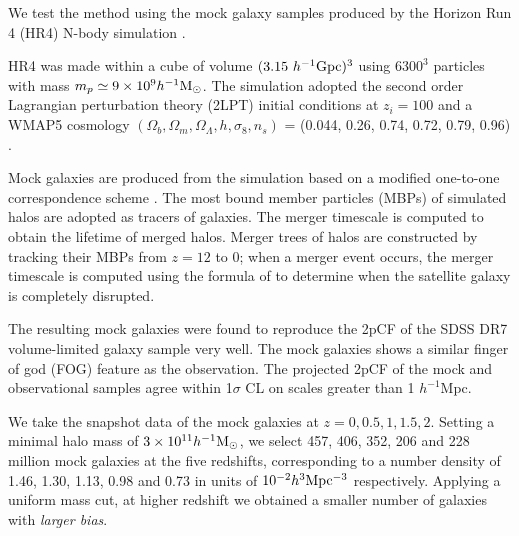\documentclass[iop]{emulateapj}
\newcommand{\hMsun}{{\ifmmode{h^{-1}{\rm
        {M_{\odot}}}}\else{$h^{-1}{\rm{M_{\odot}}}$~}\fi}}
\begin{document}
We test the method using the mock galaxy samples produced by the Horizon Run 4  (HR4) N-body simulation \citep{hr4,hong2016}.

HR4 was made within a cube of volume $({3.15}\ h^{-1}\rm Gpc)^3$ using  $6300^3$ particles with mass $m_p\simeq 9 \times 10^9 \hMsun$.
The simulation adopted the second order Lagrangian perturbation theory (2LPT) initial conditions at $z_{i}=100$
and a WMAP5 cosmology $(\Omega_{b},\Omega_{m},\Omega_\Lambda,h,\sigma_8,n_s)$  = (0.044, 0.26, 0.74, 0.72, 0.79, 0.96) \citep{komatsu 2011}.

Mock galaxies are produced from the simulation based on a modified one-to-one correspondence scheme \citep{hong2016}. 
The most bound member particles (MBPs) of simulated halos are adopted as tracers of galaxies.
The merger timescale is computed to obtain the lifetime of merged halos.
Merger trees of halos are constructed by tracking their MBPs from $z = 12$ to 0;
when a merger event occurs, the merger timescale is computed using the formula of \cite{jiang2008} to 
determine when the satellite galaxy is completely disrupted.

The resulting mock galaxies were found to reproduce the 2pCF of the SDSS DR7 volume-limited galaxy sample \citep{zehavi2011} very well.
The mock galaxies shows a similar finger of god (FOG) feature \citep{FOG} as the observation.
The projected 2pCF of the mock and observational samples agree within 1$\sigma$ CL
on scales greater than 1 ${h^{-1}}$Mpc.

We take the snapshot data of the mock galaxies at $z=0,0.5,1,1.5,2$.
Setting a minimal halo mass of $3\times 10^{11} \hMsun$, 
we select 457, 406, 352, 206 and 228 million mock galaxies at the five redshifts,
corresponding to a number density of 
1.46, 1.30, 1.13, 0.98 and 0.73 in units of $ 10^{-2} h^{3} \rm Mpc^{-3}$
respectively.
Applying a uniform mass cut, at higher redshift we obtained a smaller number of galaxies with {\it larger bias}.
\end{document}
